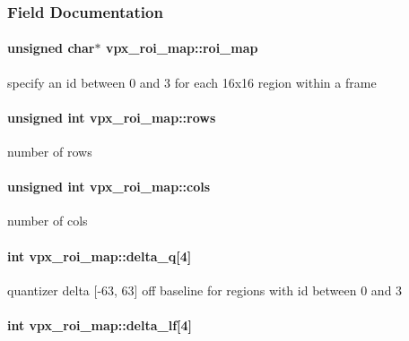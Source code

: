 \subsubsection{Field Documentation}
\hypertarget{structvpx__roi__map_aba69e211b81d622977ba07ac47b61075}{
\paragraph[{roi\-\_\-map}]{\setlength{\rightskip}{0pt plus 5cm}unsigned char$\ast$ vpx\-\_\-roi\-\_\-map\-::roi\-\_\-map}}\label{structvpx__roi__map_aba69e211b81d622977ba07ac47b61075}
specify an id between 0 and 3 for each 16x16 region within a frame \hypertarget{structvpx__roi__map_a3fdcecd472553d08a99ced02cda5c9a6}{
\paragraph[{rows}]{\setlength{\rightskip}{0pt plus 5cm}unsigned int vpx\-\_\-roi\-\_\-map\-::rows}}\label{structvpx__roi__map_a3fdcecd472553d08a99ced02cda5c9a6}
number of rows \hypertarget{structvpx__roi__map_a5458459aaf16b14b86fb0adef32757c8}{
\paragraph[{cols}]{\setlength{\rightskip}{0pt plus 5cm}unsigned int vpx\-\_\-roi\-\_\-map\-::cols}}\label{structvpx__roi__map_a5458459aaf16b14b86fb0adef32757c8}
number of cols \hypertarget{structvpx__roi__map_a6e7aecf1d31c329f43dcb36717b3999b}{
\paragraph[{delta\-\_\-q}]{\setlength{\rightskip}{0pt plus 5cm}int vpx\-\_\-roi\-\_\-map\-::delta\-\_\-q\mbox{[}4\mbox{]}}}\label{structvpx__roi__map_a6e7aecf1d31c329f43dcb36717b3999b}
quantizer delta \mbox{[}-\/63, 63\mbox{]} off baseline for regions with id between 0 and 3 \hypertarget{structvpx__roi__map_a5164be48a612bf872b81e0a86726fbed}{
\paragraph[{delta\-\_\-lf}]{\setlength{\rightskip}{0pt plus 5cm}int vpx\-\_\-roi\-\_\-map\-::delta\-\_\-lf\mbox{[}4\mbox{]}}}\label{structvpx__roi__map_a5164be48a612bf872b81e0a86726fbed}
